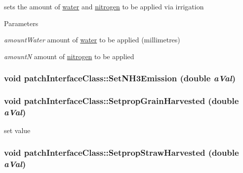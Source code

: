 sets the amount of \hyperlink{classwater}{water} and \hyperlink{classnitrogen}{nitrogen} to be applied via irrigation 
\begin{DoxyParams}{Parameters}
\item[{\em amountWater}]amount of \hyperlink{classwater}{water} to be applied (millimetres) \item[{\em amountN}]amount of \hyperlink{classnitrogen}{nitrogen} to be applied \end{DoxyParams}
\hypertarget{classpatch_interface_class_ac5e85fb7be801cc2a3cb14da479164c0}{
\subsubsection[{SetNH3Emission}]{\setlength{\rightskip}{0pt plus 5cm}void patchInterfaceClass::SetNH3Emission (double {\em aVal})}}
\label{classpatch_interface_class_ac5e85fb7be801cc2a3cb14da479164c0}
\hypertarget{classpatch_interface_class_aa1f55cbaf1895b13dd8a7902e90f9714}{
\subsubsection[{SetpropGrainHarvested}]{\setlength{\rightskip}{0pt plus 5cm}void patchInterfaceClass::SetpropGrainHarvested (double {\em aVal})}}
\label{classpatch_interface_class_aa1f55cbaf1895b13dd8a7902e90f9714}


set value \hypertarget{classpatch_interface_class_ad84c3cc82cc633329f55e47a1f14b9e7}{
\subsubsection[{SetpropStrawHarvested}]{\setlength{\rightskip}{0pt plus 5cm}void patchInterfaceClass::SetpropStrawHarvested (double {\em aVal})}}
\label{classpatch_interface_class_ad84c3cc82cc633329f55e47a1f14b9e7}


